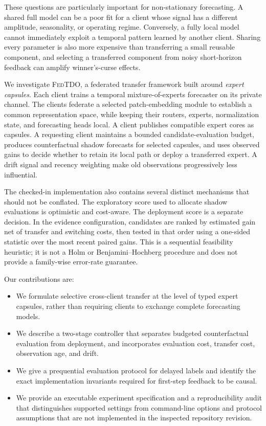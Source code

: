 \documentclass{article}
\newcommand{\method}{\textsc{FedTDO}}
\theoremstyle{definition}
\begin{document}
These questions are particularly important for non-stationary forecasting. A shared full model can be a poor fit for a client whose signal has a different amplitude, seasonality, or operating regime. Conversely, a fully local model cannot immediately exploit a temporal pattern learned by another client. Sharing every parameter is also more expensive than transferring a small reusable component, and selecting a transferred component from noisy short-horizon feedback can amplify winner's-curse effects.

We investigate \method, a federated transfer framework built around \emph{expert capsules}. Each client trains a temporal mixture-of-experts forecaster on its private channel. The clients federate a selected patch-embedding module to establish a common representation space, while keeping their routers, experts, normalization state, and forecasting heads local. A client publishes compatible expert cores as capsules. A requesting client maintains a bounded candidate-evaluation budget, produces counterfactual shadow forecasts for selected capsules, and uses observed gains to decide whether to retain its local path or deploy a transferred expert. A drift signal and recency weighting make old observations progressively less influential.

The checked-in implementation also contains several distinct mechanisms that should not be conflated. The exploratory score used to allocate shadow evaluations is optimistic and cost-aware. The deployment score is a separate decision. In the evidence configuration, candidates are ranked by estimated gain net of transfer and switching costs, then tested in that order using a one-sided statistic over the most recent paired gains. This is a sequential feasibility heuristic; it is not a Holm or Benjamini--Hochberg procedure and does not provide a family-wise error-rate guarantee.

Our contributions are:
\begin{itemize}
    \item We formulate selective cross-client transfer at the level of typed expert capsules, rather than requiring clients to exchange complete forecasting models.
    \item We describe a two-stage controller that separates budgeted counterfactual evaluation from deployment, and incorporates evaluation cost, transfer cost, observation age, and drift.
    \item We give a prequential evaluation protocol for delayed labels and identify the exact implementation invariants required for first-step feedback to be causal.
    \item We provide an executable experiment specification and a reproducibility audit that distinguishes supported settings from command-line options and protocol assumptions that are not implemented in the inspected repository revision.
\end{itemize}
\end{document}
